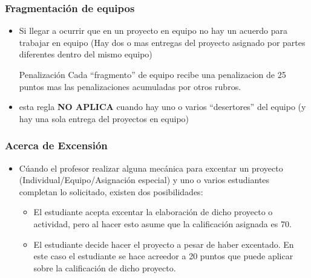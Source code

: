\begin{frame}
\frametitle{Fragmentaci\'on de equipos}
\begin{itemize}
\item Si llegar a ocurrir que en un proyecto en equipo no hay un acuerdo para trabajar en equipo (Hay dos o mas entregas del proyecto asignado por partes diferentes dentro del mismo equipo)
\begin{block}{Penalizaci\'on}
Cada ``fragmento'' de equipo recibe una penalizacion de 25 puntos mas las penalizaciones acumuladas por otros rubros. 
\end{block}
\item esta regla \textbf{NO APLICA} cuando hay uno o varios ``desertores'' del equipo (y hay una sola entrega del proyectos en equipo)
\end{itemize}

\end{frame}



\begin{frame}
\frametitle{Acerca de Excensión}
\begin{itemize}
\item Cúando el profesor realizar alguna mecánica para excentar un proyecto (Individual/Equipo/Asignación especial) y uno o varios estudiantes completan lo solicitado, existen dos posibilidades:
\begin{itemize}
\item El estudiante acepta excentar la elaboración de dicho proyecto o actividad, pero al hacer esto asume que la calificación asignada es 70.
\item El estudiante decide hacer el proyecto a pesar de haber excentado. En este caso el estudiante se hace acreedor a 20 puntos que puede aplicar sobre la calificación de dicho proyecto. 

\end{itemize}
\end{itemize}


\end{frame}



